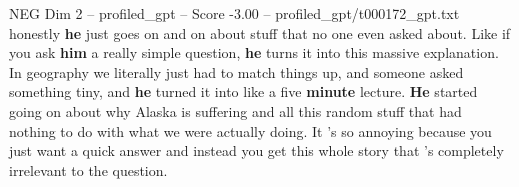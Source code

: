 \begin{textsample}{NEG Dim 2 – profiled\_gpt – Score -3.00 – profiled\_gpt/t000172\_gpt.txt}  \label{ex:f2_neg_037}
honestly \textbf{he} just goes on and on about stuff that no one even asked about.
Like if you ask \textbf{him} a really simple question, \textbf{he} turns it into this massive explanation.
In geography we literally just had to match things up, and someone asked something tiny, and \textbf{he} turned it into like a five \textbf{minute} lecture. \textbf{He} started going on about why Alaska is suffering and all this random stuff that had nothing to do with what we were actually doing.
It ’s so annoying because you just want a quick answer and instead you get this whole story that ’s completely irrelevant to the question.

\end{textsample}
